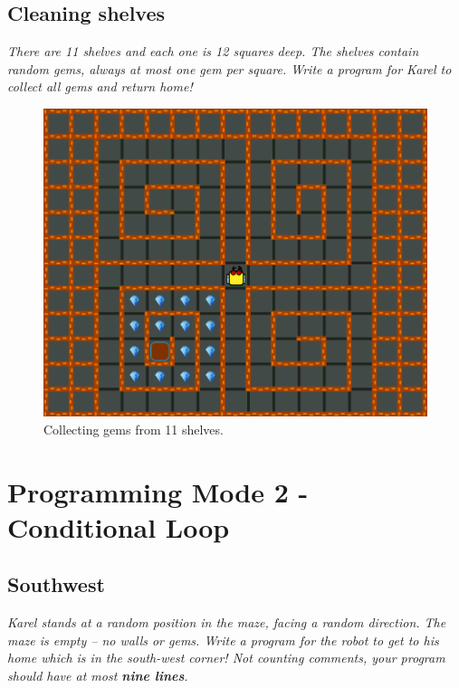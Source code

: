 \subsection{Cleaning shelves}

{\em There are 11 shelves and each one is 12 squares deep. The shelves contain random gems, always at most one gem per square. Write a program for Karel to collect all gems and return home!}\\[-4mm]


\vspace{-5mm}
\begin{figure}[!ht]
\begin{center}
\includegraphics[height=0.4\textwidth]{img/d04.png}
\end{center}
\vspace{-4mm}
\caption{Collecting gems from 11 shelves.}
\label{fig:d04}
\vspace{-12mm}
\end{figure}
\newpage


\section{Programming Mode 2 - Conditional Loop}

\subsection{Southwest}

{\em Karel stands at a random position in the maze, facing a random direction. The maze is empty -- no walls or gems. Write a program for the robot to get to his home which is in the south-west corner! Not counting comments, your program should have 
at most {\bf nine lines}.}\\[-8mm]

